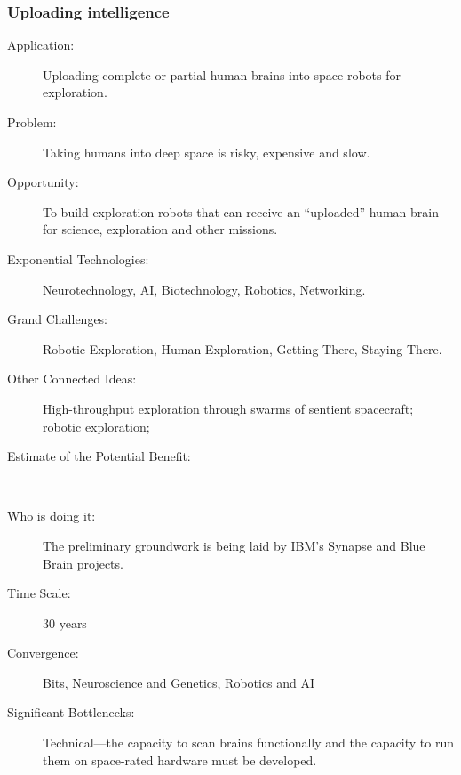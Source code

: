 \subsubsection{Uploading intelligence}
 
\begin{description} \item[Application:] Uploading complete or partial human brains into space robots for exploration.
 
  \item[Problem:] Taking humans into deep space is risky, expensive and slow.
 
  \item[Opportunity:] To build exploration robots that can receive an ``uploaded'' human brain for science, exploration and other missions.
 
  \item[Exponential Technologies:] Neurotechnology, AI, Biotechnology,
Robotics, Networking.
 
  \item[Grand Challenges:] Robotic Exploration, Human Exploration, Getting
There, Staying There.
 
  \item[Other Connected Ideas:] High-throughput exploration through swarms of
sentient spacecraft; robotic exploration;
 
  \item[Estimate of the Potential Benefit:]-
 
  \item[Who is doing it:] The preliminary groundwork is being laid by IBM's Synapse and Blue Brain projects.
 
  \item[Time Scale:] 30 years
 
  \item[Convergence:] Bits, Neuroscience and Genetics, Robotics and AI
 
  \item[Significant Bottlenecks:] Technical---the capacity to scan brains functionally and the capacity to run them on space-rated hardware must be developed.
  \end{description}


 
